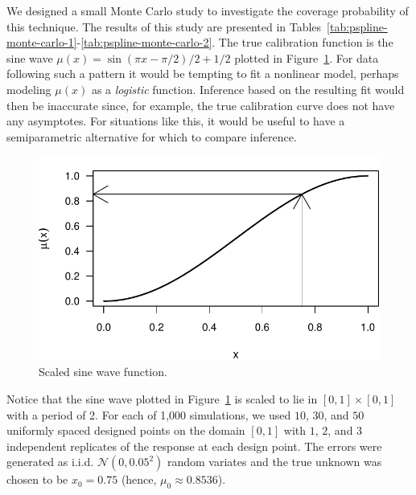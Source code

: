 \documentclass[cmfont,usenames,dvipsnames,leqno]{afit-etd}\usepackage[]{graphicx}\usepackage[]{color}
\makeatletter
\def\maxwidth{ %
  \ifdim\Gin@nat@width>\linewidth
    \linewidth
  \else
    \Gin@nat@width
  \fi
}
\newenvironment{knitrout}{}{} %
\renewenvironment{knitrout}{\begin{singlespace}}{\end{singlespace}}
\newcommand{\mc}[1]{\ensuremath{\mathcal{#1}}}
\makeatother
\begin{document}
We designed a small Monte Carlo study to investigate the coverage probability of this technique. The results of this study are presented in Tables~\ref{tab:pspline-monte-carlo-1}-\ref{tab:pspline-monte-carlo-2}. The true calibration function is the sine wave $\mu(x) = \sin(\pi x - \pi/2)/2 + 1/2$ plotted in Figure~\ref{fig:sine-wave}. For data following such a pattern it would be tempting to fit a nonlinear model, perhaps modeling $\mu(x)$ as a \textit{logistic} function. Inference based on the resulting fit would then be inaccurate since, for example, the true calibration curve does not have any asymptotes. For situations like this, it would be useful to have a semiparametric alternative for which to compare inference.

\begin{knitrout}
\color{fgcolor}\begin{figure}[H]

\includegraphics[width=\maxwidth]{figure/sine-wave} \caption[Scaled sine wave example]{Scaled sine wave function.\label{fig:sine-wave}}
\end{figure}


\end{knitrout}


Notice that the sine wave plotted in Figure~\ref{fig:sine-wave} is scaled to lie in $[0, 1] \times [0, 1]$ with a period of 2. For each of 1,000 simulations, we used $10$, $30$, and $50$ uniformly spaced designed points on the domain $[0, 1]$ with $1$, $2$, and $3$ independent replicates of the response at each design point. The errors were generated as i.i.d. $\mc{N}(0, 0.05^2)$ random variates and the true unknown was chosen to be $x_0 = 0.75$ (hence, $\mu_0 \approx 0.8536$).
\end{document}
